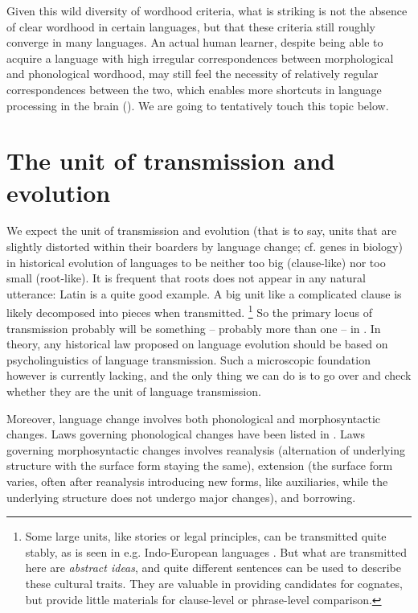 \documentclass[a4paper, oneside, scheme=plain, 12pt]{article}
\newcommand*{\citechap}[1]{Ch.~{#1}}
\begin{document}
Given this wild diversity of wordhood criteria,
what is striking is not the absence of clear wordhood in certain languages,
but that these criteria still roughly converge in many languages.
An actual human learner, despite being able to acquire a language with high irregular correspondences between morphological and phonological wordhood,
may still feel the necessity of relatively regular correspondences between the two,
which enables more shortcuts in language processing in the brain ().
We are going to tentatively touch this topic below.

\section{The unit of transmission and evolution}\label{sec:unit-of-transmission}

We expect the unit of transmission and evolution
(that is to say, units that are slightly distorted within their boarders by language change;
cf. genes in biology)
in historical evolution of languages
to be neither too big (clause-like) nor too small (root-like).
It is frequent that roots does not appear in any natural utterance:
Latin is a quite good example.
A big unit like a complicated clause is likely decomposed into pieces when transmitted.%
\footnote{
    Some large units, like stories or legal principles, can be transmitted quite stably,
    as is seen in e.g. Indo-European languages \citep[\citechap{2}]{fortson2011indo}.
    But what are transmitted here are \emph{abstract ideas},
    and quite different sentences can be used to describe these cultural traits.
    They are valuable in providing candidates for cognates,
    but provide little materials for clause-level or phrase-level comparison.
}
So the primary locus of transmission probably will be something -- probably more than one -- in .
In theory, any historical law proposed on language evolution 
should be based on psycholinguistics of language transmission.
Such a microscopic foundation however is currently lacking,
and the only thing we can do is to go over 
and check whether they are the unit of language transmission.

Moreover, language change involves both phonological and morphosyntactic changes.
Laws governing phonological changes have been listed in .
Laws governing morphosyntactic changes involves reanalysis (alternation of underlying structure with the surface form staying the same), extension (the surface form varies, often after reanalysis introducing new forms, like auxiliaries, while the underlying structure does not undergo major changes), and borrowing.
\end{document}
